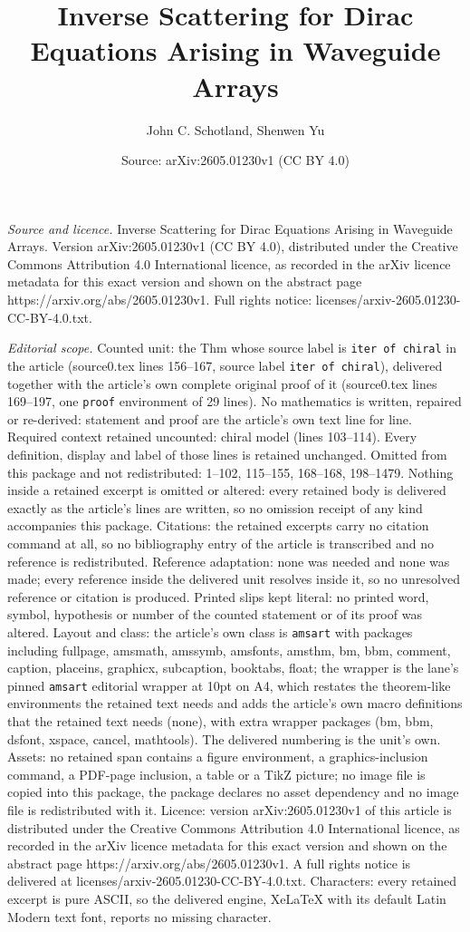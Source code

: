\documentclass[10pt,a4paper]{amsart}
\title[Inverse Scattering for Dirac Equations Arising in Waveguide ]{Inverse Scattering for Dirac Equations Arising in Waveguide Arrays}
\author{John C. Schotland, Shenwen Yu}
\date{Source: arXiv:2605.01230v1 (CC BY 4.0)}
\begin{document}
\maketitle

\noindent\emph{Source and licence.} Inverse Scattering for Dirac Equations Arising in Waveguide Arrays. Version arXiv:2605.01230v1 (CC BY 4.0), distributed under the Creative Commons Attribution 4.0 International licence, as recorded in the arXiv licence metadata for this exact version and shown on the abstract page https://arxiv.org/abs/2605.01230v1. Full rights notice: licenses/arxiv-2605.01230-CC-BY-4.0.txt.\par\smallskip

\noindent\textit{Editorial scope.} Counted unit: the Thm whose source label is \texttt{iter of chiral} in the article (source0.tex lines 156--167, source label \texttt{iter of chiral}), delivered together with the article's own complete original proof of it (source0.tex lines 169--197, one \texttt{proof} environment of 29 lines). No mathematics is written, repaired or re-derived: statement and proof are the article's own text line for line. Required context retained uncounted: chiral model (lines 103--114). Every definition, display and label of those lines is retained unchanged. Omitted from this package and not redistributed: 1--102, 115--155, 168--168, 198--1479. Nothing inside a retained excerpt is omitted or altered: every retained body is delivered exactly as the article's lines are written, so no omission receipt of any kind accompanies this package. Citations: the retained excerpts carry no citation command at all, so no bibliography entry of the article is transcribed and no reference is redistributed. Reference adaptation: none was needed and none was made; every reference inside the delivered unit resolves inside it, so no unresolved reference or citation is produced. Printed slips kept literal: no printed word, symbol, hypothesis or number of the counted statement or of its proof was altered. Layout and class: the article's own class is \texttt{amsart} with packages including fullpage, amsmath, amssymb, amsfonts, amsthm, bm, bbm, comment, caption, placeins, graphicx, subcaption, booktabs, float; the wrapper is the lane's pinned \texttt{amsart} editorial wrapper at 10pt on A4, which restates the theorem-like environments the retained text needs and adds the article's own macro definitions that the retained text needs (none), with extra wrapper packages (bm, bbm, dsfont, xspace, cancel, mathtools). The delivered numbering is the unit's own. Assets: no retained span contains a figure environment, a graphics-inclusion command, a PDF-page inclusion, a table or a TikZ picture; no image file is copied into this package, the package declares no asset dependency and no image file is redistributed with it. Licence: version arXiv:2605.01230v1 of this article is distributed under the Creative Commons Attribution 4.0 International licence, as recorded in the arXiv licence metadata for this exact version and shown on the abstract page https://arxiv.org/abs/2605.01230v1. A full rights notice is delivered at licenses/arxiv-2605.01230-CC-BY-4.0.txt. Characters: every retained excerpt is pure ASCII, so the delivered engine, XeLaTeX with its default Latin Modern text font, reports no missing character.
\end{document}
